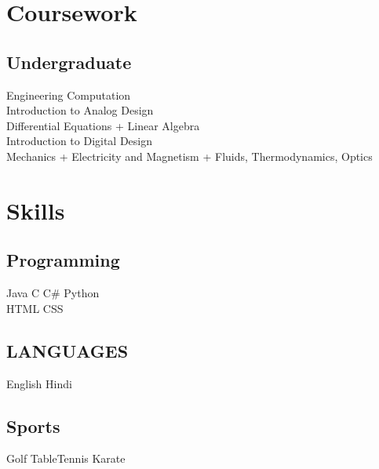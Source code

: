 \documentclass[]{deedy-resume-openfont}
\begin{document}
\begin{minipage}[t]{0.31\textwidth}
\section{Coursework}

\subsection{Undergraduate}
\textbullet Engineering Computation \\
\textbullet Introduction to Analog Design \\
\textbullet Differential Equations + Linear Algebra \\
\textbullet Introduction to Digital Design \\
\textbullet Mechanics + Electricity and Magnetism + Fluids, Thermodynamics, Optics \\
\sectionsep


\section{Skills}
\subsection{Programming}
Java \textbullet{} C \textbullet{} C\# \textbullet{} Python \\
HTML \textbullet{} CSS \\
\sectionsep
\subsection{LANGUAGES}
English \textbullet{} Hindi
\sectionsep

\subsection{Sports}
 Golf \textbullet{} Table\-Tennis \textbullet{} Karate\\
\sectionsep
%
%

\end{minipage} 
\hfill
\end{document}
